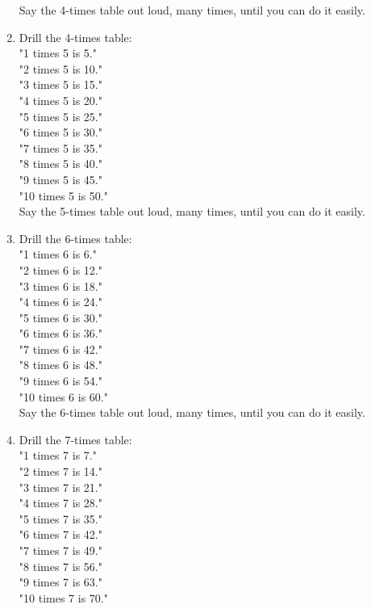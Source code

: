 \documentclass[12pt]{article}
\begin{document}
\begin{enumerate}
Say the 4-times table out loud, many times, until you can do it easily.\\

\item Drill the 4-times table:\\

"1 times 5 is 5."\\
"2 times 5 is 10."\\
"3 times 5 is 15."\\
"4 times 5 is 20."\\
"5 times 5 is 25."\\
"6 times 5 is 30."\\
"7 times 5 is 35."\\
"8 times 5 is 40."\\
"9 times 5 is 45."\\
"10 times 5 is 50."\\

Say the 5-times table out loud, many times, until you can do it easily.\\

\item Drill the 6-times table:\\

"1 times 6 is 6."\\
"2 times 6 is 12."\\
"3 times 6 is 18."\\
"4 times 6 is 24."\\
"5 times 6 is 30."\\
"6 times 6 is 36."\\
"7 times 6 is 42."\\
"8 times 6 is 48."\\
"9 times 6 is 54."\\
"10 times 6 is 60."\\

Say the 6-times table out loud, many times, until you can do it easily.\\

\item Drill the 7-times table:\\

"1 times 7 is 7."\\
"2 times 7 is 14."\\
"3 times 7 is 21."\\
"4 times 7 is 28."\\
"5 times 7 is 35."\\
"6 times 7 is 42."\\
"7 times 7 is 49."\\
"8 times 7 is 56."\\
"9 times 7 is 63."\\
"10 times 7 is 70."\\


\end{enumerate}
\end{document}
